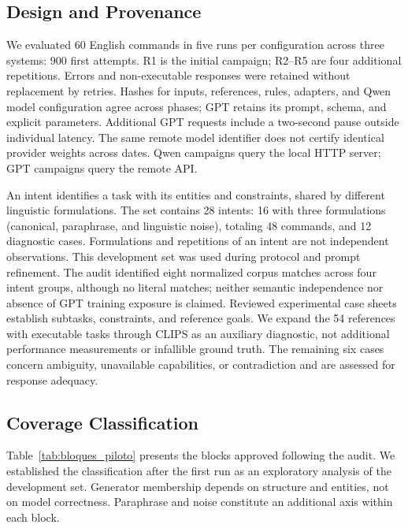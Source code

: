 \documentclass[a4paper,twoside]{article}
\begin{document}
\subsection{Design and Provenance}
We evaluated 60 English commands in five runs per configuration across three systems: 900 first attempts. R1 is the initial campaign; R2--R5 are four additional repetitions. Errors and non-executable responses were retained without replacement by retries. Hashes for inputs, references, rules, adapters, and Qwen model configuration agree across phases; GPT retains its prompt, schema, and explicit parameters. Additional GPT requests include a two-second pause outside individual latency. The same remote model identifier does not certify identical provider weights across dates. Qwen campaigns query the local HTTP server; GPT campaigns query the remote API.

An intent identifies a task with its entities and constraints, shared by different linguistic formulations. The set contains 28 intents: 16 with three formulations (canonical, paraphrase, and linguistic noise), totaling 48 commands, and 12 diagnostic cases. Formulations and repetitions of an intent are not independent observations. This development set was used during protocol and prompt refinement. The audit identified eight normalized corpus matches across four intent groups, although no literal matches; neither semantic independence nor absence of GPT training exposure is claimed. Reviewed experimental case sheets establish subtasks, constraints, and reference goals. We expand the 54 references with executable tasks through CLIPS as an auxiliary diagnostic, not additional performance measurements or infallible ground truth. The remaining six cases concern ambiguity, unavailable capabilities, or contradiction and are assessed for response adequacy.

\subsection{Coverage Classification}

Table~\ref{tab:bloques_piloto} presents the blocks approved following the audit. We established the classification after the first run as an exploratory analysis of the development set. Generator membership depends on structure and entities, not on model correctness. Paraphrase and noise constitute an additional axis within each block.
\end{document}
